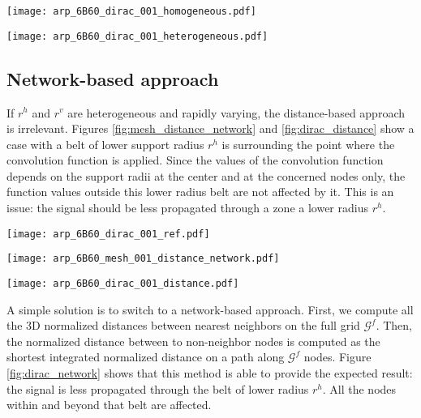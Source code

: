 \documentclass[12pt]{scrartcl}
\begin{document}
\begin{center}
\texttt{[image: arp\_6B60\_dirac\_001\_homogeneous.pdf]}
\end{center}
\begin{center}
\texttt{[image: arp\_6B60\_dirac\_001\_heterogeneous.pdf]}
\end{center}

\subsection{Network-based approach}
If $r^h$ and $r^v$ are heterogeneous and rapidly varying, the distance-based approach is irrelevant. Figures \ref{fig:mesh_distance_network} and \ref{fig:dirac_distance} show a case with a belt of lower support radius $r^h$ is surrounding the point where the convolution function is applied. Since the values of the convolution function depends on the support radii at the center and at the concerned nodes only, the function values outside this lower radius belt are not affected by it. This is an issue: the signal should be less propagated through a zone a lower radius $r^h$.

\begin{center}
\texttt{[image: arp\_6B60\_dirac\_001\_ref.pdf]}
\end{center}
\begin{center}
\texttt{[image: arp\_6B60\_mesh\_001\_distance\_network.pdf]}
\end{center}
\begin{center}
\texttt{[image: arp\_6B60\_dirac\_001\_distance.pdf]}
\end{center}

A simple solution is to switch to a network-based approach. First, we compute all the 3D normalized distances between nearest neighbors on the full grid $\mathcal{G}^f$. Then, the normalized distance between to non-neighbor nodes is computed as the shortest integrated normalized distance on a path along $\mathcal{G}^f$ nodes. Figure \ref{fig:dirac_network} shows that this method is able to provide the expected result: the signal is less propagated through the belt of lower radius $r^h$. All the nodes within and beyond that belt are affected.
\end{document}
